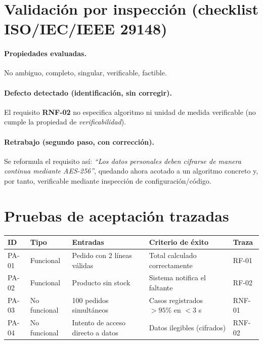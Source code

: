 \documentclass[11pt,a4paper]{article}
\begin{document}
\section{Validación por inspección (checklist ISO/IEC/IEEE 29148)}

\paragraph{Propiedades evaluadas.} No ambiguo, completo, singular, verificable, factible.

\paragraph{Defecto detectado (identificación, sin corregir).} El requisito
\textbf{RNF-02} no especifica algoritmo ni unidad de medida verificable
(no cumple la propiedad de \emph{verificabilidad}).

\paragraph{Retrabajo (segundo paso, con corrección).} Se reformula el
requisito así: \emph{``Los datos personales deben cifrarse de manera continua
mediante AES-256''}, quedando ahora acotado a un algoritmo concreto y, por
tanto, verificable mediante inspección de configuración/código.

\section{Pruebas de aceptación trazadas}

\begin{center}
\begin{tabular}{@{}lllll@{}}
\toprule
\textbf{ID} & \textbf{Tipo} & \textbf{Entradas} & \textbf{Criterio de éxito} & \textbf{Traza} \\
\midrule
PA-01 & Funcional     & Pedido con 2 líneas válidas      & Total calculado correctamente        & RF-01 \\
PA-02 & Funcional     & Producto sin stock                & Sistema notifica el faltante          & RF-02 \\
PA-03 & No funcional  & 100 pedidos simultáneos           & Casos registrados $> 95\%$ en $<3$ s  & RNF-01 \\
PA-04 & No funcional  & Intento de acceso directo a datos & Datos ilegibles (cifrados)            & RNF-02 \\
\bottomrule
\end{tabular}
\end{center}
\end{document}
